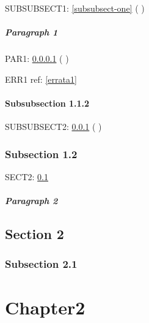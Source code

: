 \documentclass[a4paper,12pt]{report}
\makeatletter
\newcommand{\getCurrentSectionNumber}{%
  \ifnum\c@section=0 %
  \thechapter
  \else
  \ifnum\c@subsection=0 %
  \thesection
  \else
  \ifnum\c@subsubsection=0 %
  \thesubsection
  \else
  \thesubsubsection
  \fi
  \fi
  \fi
}
\makeatother
\begin{document}

SUBSUBSECT1: \cref{subsubsect-one} (\getCurrentSectionNumber)

\paragraph{Paragraph 1}\label{par-one}


PAR1: \cref{par-one}  (\getCurrentSectionNumber)


ERR1 ref: \ref{errata1}


\subsubsection{Subsubsection 1.1.2}\label{subsubsect-two}


SUBSUBSECT2: \cref{subsubsect-two} (\getCurrentSectionNumber)


\subsection{Subsection 1.2}\label{subsect-two}

SECT2: \cref{subsect-two}




\paragraph*{Paragraph 2}\label{par-two}




\section{Section 2}\label{sect-two}

\subsection{Subsection 2.1}\label{subsect-two-one}

\chapter{Chapter2}\label{chap-two}
\end{document}
